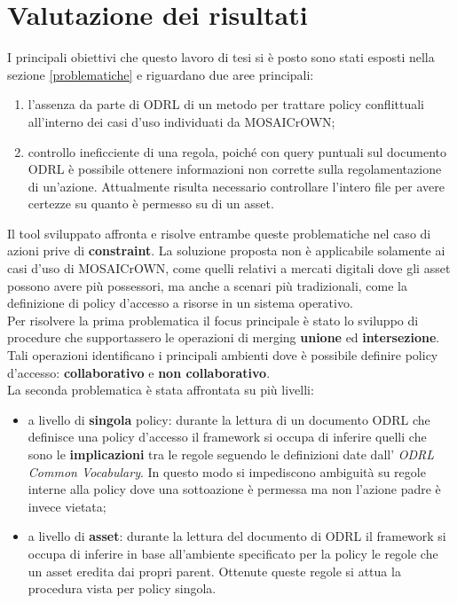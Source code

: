 \documentclass[12pt,a4paper,twoside]{book}
\begin{document}
\chapter{Valutazione dei risultati}
I principali obiettivi che questo lavoro di tesi si è posto sono stati esposti nella sezione \ref{problematiche} e riguardano due aree principali:
\begin{enumerate}
\item l'assenza da parte di ODRL di un metodo per trattare policy conflittuali all'interno dei casi d'uso individuati da MOSAICrOWN;
\item controllo ineficciente di una regola, poiché con query puntuali sul documento ODRL è possibile ottenere informazioni non corrette sulla regolamentazione di un'azione. Attualmente risulta necessario controllare l'intero file per avere certezze su quanto è permesso su di un asset.
\end{enumerate}
Il tool sviluppato affronta e risolve entrambe queste problematiche nel caso di azioni prive di \textbf{constraint}. La soluzione proposta non è applicabile solamente ai casi d'uso di MOSAICrOWN, come quelli relativi a mercati digitali dove gli asset possono avere più possessori, ma anche a scenari più tradizionali, come la definizione di policy d'accesso a risorse in un sistema operativo.\\
Per risolvere la prima problematica il focus principale è stato lo sviluppo di procedure che supportassero le operazioni di merging \textbf{unione} ed \textbf{intersezione}. Tali operazioni identificano i principali ambienti dove è possibile definire policy d'accesso: \textbf{collaborativo} e \textbf{non collaborativo}.\\
La seconda problematica è stata affrontata su più livelli:
\begin{itemize}
\item a livello di \textbf{singola} policy: durante la lettura di un documento ODRL che definisce una policy d'accesso il framework si occupa di inferire quelli che sono le \textbf{implicazioni} tra le regole seguendo le definizioni date dall' \textit{ODRL Common Vocabulary}. In questo modo si impediscono ambiguità su regole interne alla policy dove una sottoazione è permessa ma non l'azione padre è invece vietata;
\item a livello di \textbf{asset}: durante la lettura del documento di ODRL il framework si occupa di inferire in base all'ambiente specificato per la policy le regole che un asset eredita dai propri parent. Ottenute queste regole si attua la procedura vista per policy singola.
\end{itemize}
\end{document}
